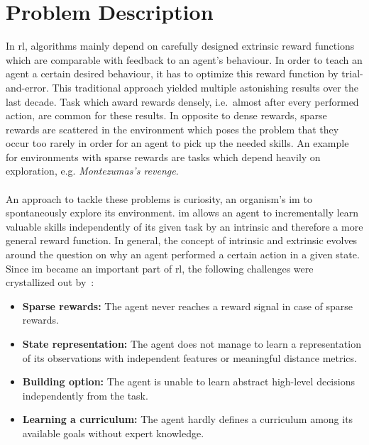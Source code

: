 \documentclass[draft,final]{vutinfth} %
\newcommand{\p}[1]{see p. #1}
\begin{document}
    \section{Problem Description}\label{sec:problem-description}
    In \gls{rl}, algorithms mainly depend on carefully designed extrinsic reward functions which are comparable with feedback to an agent's behaviour.
    In order to teach an agent a certain desired behaviour, it has to optimize this reward function by trial-and-error.
    This traditional approach yielded multiple astonishing results over the last decade.
    Task which award rewards densely, i.e.\ almost after every performed action, are common for these results.
    In opposite to dense rewards, sparse rewards are scattered in the environment which poses the problem that they occur too rarely in order for an agent to pick up the needed skills.
    An example for environments with sparse rewards are tasks which depend heavily on exploration, e.g. \textit{Montezumas's revenge}.
    \\\\
    An approach to tackle these problems is curiosity, an organism's \gls{im} to spontaneously explore its environment.
    \gls{im} allows an agent to incrementally learn valuable skills independently of its given task by an intrinsic and therefore a more general reward function.
    In general, the concept of intrinsic and extrinsic evolves around the question on why an agent performed a certain action in a given state.
    Since \gls{im} became an important part of \gls{rl}, the following challenges were crystallized out by~\cite[\p{6}]{aubret_survey_2019}:

    \begin{itemize}
        \item \textbf{Sparse rewards:} The agent never reaches a reward signal in case of sparse rewards.
        \item \textbf{State representation:} The agent does not manage to learn a representation of its observations with independent features or meaningful distance metrics.
        \item \textbf{Building option:} The agent is unable to learn abstract high-level decisions independently from the task.
        \item \textbf{Learning a curriculum:} The agent hardly defines a curriculum among its available goals without expert knowledge.
    \end{itemize}
\end{document}
